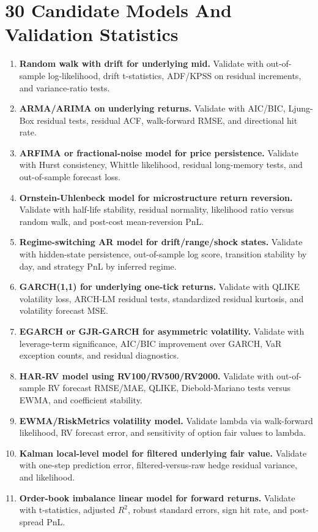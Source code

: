 \documentclass[11pt]{article}
\begin{document}
\section{30 Candidate Models And Validation Statistics}

\begin{enumerate}[label=M\arabic*.,leftmargin=*]
  \item \textbf{Random walk with drift for underlying mid.} Validate with out-of-sample log-likelihood, drift t-statistics, ADF/KPSS on residual increments, and variance-ratio tests.
  \item \textbf{ARMA/ARIMA on underlying returns.} Validate with AIC/BIC, Ljung-Box residual tests, residual ACF, walk-forward RMSE, and directional hit rate.
  \item \textbf{ARFIMA or fractional-noise model for price persistence.} Validate with Hurst consistency, Whittle likelihood, residual long-memory tests, and out-of-sample forecast loss.
  \item \textbf{Ornstein-Uhlenbeck model for microstructure return reversion.} Validate with half-life stability, residual normality, likelihood ratio versus random walk, and post-cost mean-reversion PnL.
  \item \textbf{Regime-switching AR model for drift/range/shock states.} Validate with hidden-state persistence, out-of-sample log score, transition stability by day, and strategy PnL by inferred regime.
  \item \textbf{GARCH(1,1) for underlying one-tick returns.} Validate with QLIKE volatility loss, ARCH-LM residual tests, standardized residual kurtosis, and volatility forecast MSE.
  \item \textbf{EGARCH or GJR-GARCH for asymmetric volatility.} Validate with leverage-term significance, AIC/BIC improvement over GARCH, VaR exception counts, and residual diagnostics.
  \item \textbf{HAR-RV model using RV100/RV500/RV2000.} Validate with out-of-sample RV forecast RMSE/MAE, QLIKE, Diebold-Mariano tests versus EWMA, and coefficient stability.
  \item \textbf{EWMA/RiskMetrics volatility model.} Validate lambda via walk-forward likelihood, RV forecast error, and sensitivity of option fair values to lambda.
  \item \textbf{Kalman local-level model for filtered underlying fair value.} Validate with one-step prediction error, filtered-versus-raw hedge residual variance, and likelihood.
  \item \textbf{Order-book imbalance linear model for forward returns.} Validate with t-statistics, adjusted \(R^2\), robust standard errors, sign hit rate, and post-spread PnL.

\end{enumerate}
\end{document}
